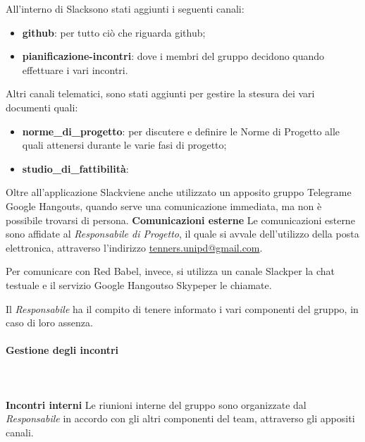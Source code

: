    					All'interno di Slack\glo sono stati aggiunti i seguenti canali:
   					\begin{itemize}
   						\item \textbf{github}: per tutto ciò che 	riguarda github;
   						\item \textbf{pianificazione-incontri}: dove i membri del gruppo decidono quando effettuare i vari incontri.
   					\end{itemize}
   					Altri canali telematici, sono stati aggiunti per gestire la stesura dei vari documenti quali:
   					\begin{itemize}
   						\item \textbf{norme\_di\_progetto}: per discutere e definire le Norme di Progetto alle quali attenersi durante le varie fasi di progetto;
   						\item \textbf{studio\_di\_fattibilità}: 
   					\end{itemize}
   					Oltre all'applicazione Slack\glo viene anche utilizzato un apposito gruppo Telegram\glos e Google Hangouts\glos, quando serve una comunicazione immediata, ma non è possibile trovarsi di persona.
   				\newline \newline
   				\textbf{Comunicazioni esterne} \newline \newline
   					Le comunicazioni esterne sono affidate al \textit{Responsabile di Progetto}, il quale si avvale dell'utilizzo della posta elettronica, attraverso l'indirizzo \href{mailto:tenners.unipd@gmail.com}{tenners.unipd@gmail.com}.
   					
   					Per comunicare con Red Babel, invece, si utilizza un canale Slack\glo per la chat testuale e il servizio Google Hangouts\glo o Skype\glo per le chiamate.
   					
   					Il \textit{Responsabile} ha il compito di tenere informato i vari componenti del gruppo, in caso di loro assenza.
   			\paragraph{Gestione degli incontri}  \mbox{}\\ \mbox{}\\
   				\textbf{Incontri interni}\newline \newline
   					Le riunioni interne del gruppo sono organizzate dal \textit{Responsabile} in accordo con gli altri componenti del team, attraverso gli appositi canali.
   					
